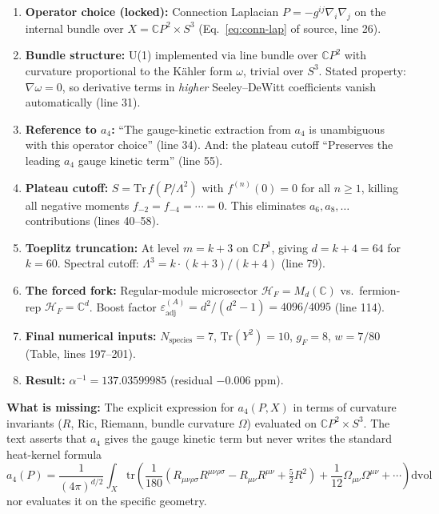 \documentclass[11pt,a4paper]{article}
\begin{document}
\begin{enumerate}
\item \textbf{Operator choice (locked):} Connection Laplacian
$P = -g^{ij}\nabla_i\nabla_j$ on the internal bundle over
$X = \mathbb{C}P^2 \times S^3$ (Eq.~\ref{eq:conn-lap} of source, line 26).

\item \textbf{Bundle structure:} U(1) implemented via line bundle over
$\mathbb{C}P^2$ with curvature proportional to the K\"ahler form $\omega$,
trivial over $S^3$.  Stated property: $\nabla\omega = 0$, so derivative terms
in \emph{higher} Seeley--DeWitt coefficients vanish automatically (line 31).

\item \textbf{Reference to $a_4$:} ``The gauge-kinetic extraction from $a_4$
is unambiguous with this operator choice'' (line 34).  And: the plateau cutoff
``Preserves the leading $a_4$ gauge kinetic term'' (line 55).

\item \textbf{Plateau cutoff:} $S = \mathrm{Tr}\,f(P/\Lambda^2)$ with
$f^{(n)}(0) = 0$ for all $n \geq 1$, killing all negative moments
$f_{-2} = f_{-4} = \cdots = 0$.  This eliminates $a_6, a_8, \ldots$
contributions (lines 40--58).

\item \textbf{Toeplitz truncation:} At level $m = k+3$ on $\mathbb{C}P^1$,
giving $d = k+4 = 64$ for $k = 60$.  Spectral cutoff:
$\Lambda^3 = k \cdot (k+3)/(k+4)$ (line 79).

\item \textbf{The forced fork:} Regular-module microsector
$\mathcal{H}_F = M_d(\mathbb{C})$ vs.\ fermion-rep $\mathcal{H}_F = \mathbb{C}^d$.
Boost factor $\varepsilon_{\mathrm{adj}}^{(A)} = d^2/(d^2-1) = 4096/4095$
(line 114).

\item \textbf{Final numerical inputs:} $N_{\mathrm{species}} = 7$,
$\mathrm{Tr}(Y^2) = 10$, $g_F = 8$, $w = 7/80$ (Table, lines 197--201).

\item \textbf{Result:} $\alpha^{-1} = 137.03599985$ (residual $-0.006$ ppm).
\end{enumerate}

\textbf{What is missing:} The explicit expression for $a_4(P, X)$ in terms of
curvature invariants ($R$, $\mathrm{Ric}$, Riemann, bundle curvature $\Omega$)
evaluated on $\mathbb{C}P^2 \times S^3$.  The text asserts that $a_4$ gives
the gauge kinetic term but never writes the standard heat-kernel formula
\begin{equation}\label{eq:standard-a4}
a_4(P) = \frac{1}{(4\pi)^{d/2}} \int_X \mathrm{tr}\!\left(
\frac{1}{180}(R_{\mu\nu\rho\sigma}R^{\mu\nu\rho\sigma}
- R_{\mu\nu}R^{\mu\nu} + \tfrac{5}{2}R^2)
+ \frac{1}{12}\Omega_{\mu\nu}\Omega^{\mu\nu}
+ \cdots \right) \mathrm{dvol}
\end{equation}
nor evaluates it on the specific geometry.
\end{document}
